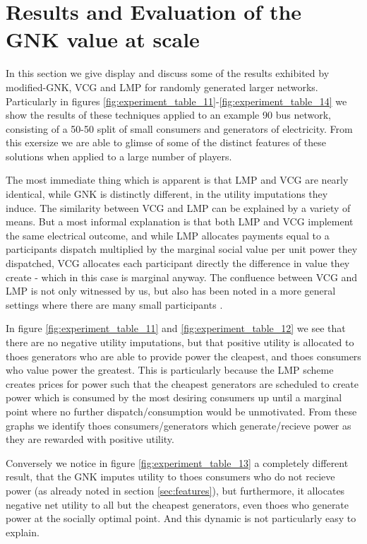 \section{Results and Evaluation of the GNK value at scale}\label{sec:results_and_evaluation_of_GNK}


In this section we give display and discuss some of the results exhibited by modified-GNK, VCG and LMP for randomly generated larger networks.
Particularly in figures \ref{fig:experiment_table_11}-\ref{fig:experiment_table_14} we show the results of these techniques applied to an example 90 bus network, consisting of a 50-50 split of small consumers and generators of electricity.
From this exersize we are able to glimse of some of the distinct features of these solutions when applied to a large number of players.

The most immediate thing which is apparent is that LMP and VCG are nearly identical, while GNK is distinctly different, in the utility imputations they induce.
The similarity between VCG and LMP can be explained by a variety of means.
But a most informal explanation is that both LMP and VCG implement the same electrical outcome, and while LMP allocates payments equal to a participants dispatch multiplied by the marginal social value per unit power they dispatched, VCG allocates each participant directly the difference in value they create - which in this case is marginal anyway.
The confluence between VCG and LMP is not only witnessed by us, but also has been noted in a more general settings where there are many small participants \cite{NATH2019673, 8430852}.%

In figure \ref{fig:experiment_table_11} and \ref{fig:experiment_table_12} we see that there are no negative utility imputations, but that positive utility is allocated to thoes generators who are able to provide power the cleapest, and thoes consumers who value power the greatest.
This is particularly because the LMP scheme creates prices for power such that the cheapest generators are scheduled to create power which is consumed by the most desiring consumers up until a marginal point where no further dispatch/consumption would be unmotivated.
From these graphs we identify thoes consumers/generators which generate/recieve power as they are rewarded with positive utility.

Conversely we notice in figure \ref{fig:experiment_table_13} a completely different result, that the GNK imputes utility to thoes consumers who do not recieve power (as already noted in section \ref{sec:features}), but furthermore, it allocates negative net utility to all but the cheapest generators, even thoes who generate power at the socially optimal point.
And this dynamic is not particularly easy to explain.

